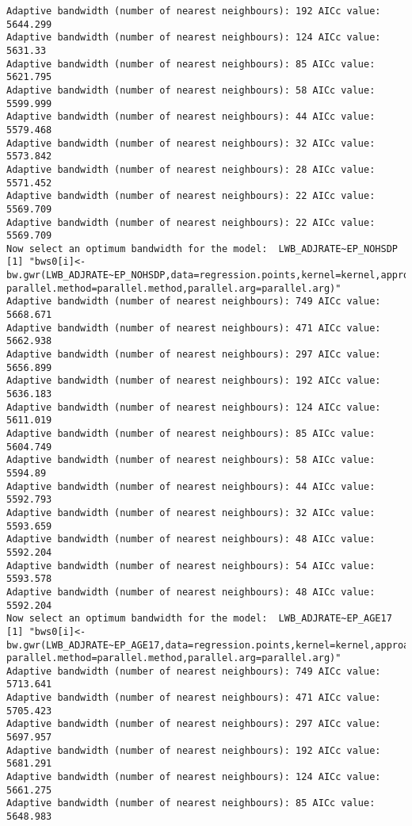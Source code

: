 \documentclass[
  12pt,
]{article}
\begin{document}
\begin{verbatim}
Adaptive bandwidth (number of nearest neighbours): 192 AICc value: 5644.299 
Adaptive bandwidth (number of nearest neighbours): 124 AICc value: 5631.33 
Adaptive bandwidth (number of nearest neighbours): 85 AICc value: 5621.795 
Adaptive bandwidth (number of nearest neighbours): 58 AICc value: 5599.999 
Adaptive bandwidth (number of nearest neighbours): 44 AICc value: 5579.468 
Adaptive bandwidth (number of nearest neighbours): 32 AICc value: 5573.842 
Adaptive bandwidth (number of nearest neighbours): 28 AICc value: 5571.452 
Adaptive bandwidth (number of nearest neighbours): 22 AICc value: 5569.709 
Adaptive bandwidth (number of nearest neighbours): 22 AICc value: 5569.709 
Now select an optimum bandwidth for the model:  LWB_ADJRATE~EP_NOHSDP 
[1] "bws0[i]<-bw.gwr(LWB_ADJRATE~EP_NOHSDP,data=regression.points,kernel=kernel,approach=approach,adaptive=adaptive,dMat=dMats[[var.dMat.indx[i]]], parallel.method=parallel.method,parallel.arg=parallel.arg)"
Adaptive bandwidth (number of nearest neighbours): 749 AICc value: 5668.671 
Adaptive bandwidth (number of nearest neighbours): 471 AICc value: 5662.938 
Adaptive bandwidth (number of nearest neighbours): 297 AICc value: 5656.899 
Adaptive bandwidth (number of nearest neighbours): 192 AICc value: 5636.183 
Adaptive bandwidth (number of nearest neighbours): 124 AICc value: 5611.019 
Adaptive bandwidth (number of nearest neighbours): 85 AICc value: 5604.749 
Adaptive bandwidth (number of nearest neighbours): 58 AICc value: 5594.89 
Adaptive bandwidth (number of nearest neighbours): 44 AICc value: 5592.793 
Adaptive bandwidth (number of nearest neighbours): 32 AICc value: 5593.659 
Adaptive bandwidth (number of nearest neighbours): 48 AICc value: 5592.204 
Adaptive bandwidth (number of nearest neighbours): 54 AICc value: 5593.578 
Adaptive bandwidth (number of nearest neighbours): 48 AICc value: 5592.204 
Now select an optimum bandwidth for the model:  LWB_ADJRATE~EP_AGE17 
[1] "bws0[i]<-bw.gwr(LWB_ADJRATE~EP_AGE17,data=regression.points,kernel=kernel,approach=approach,adaptive=adaptive,dMat=dMats[[var.dMat.indx[i]]], parallel.method=parallel.method,parallel.arg=parallel.arg)"
Adaptive bandwidth (number of nearest neighbours): 749 AICc value: 5713.641 
Adaptive bandwidth (number of nearest neighbours): 471 AICc value: 5705.423 
Adaptive bandwidth (number of nearest neighbours): 297 AICc value: 5697.957 
Adaptive bandwidth (number of nearest neighbours): 192 AICc value: 5681.291 
Adaptive bandwidth (number of nearest neighbours): 124 AICc value: 5661.275 
Adaptive bandwidth (number of nearest neighbours): 85 AICc value: 5648.983 

\end{verbatim}
\end{document}
